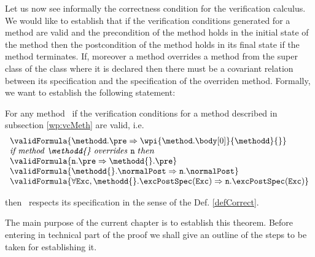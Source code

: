 
Let us now see informally the correctness condition for the verification calculus. 
We would like to establish that if the verification conditions
generated for a method 
are valid 
and the precondition of the method holds in the initial state of the method 
then the postcondition of  the method holds in its final state if the method terminates. 
If, moreover a method overrides a method from the super class of the class where it is declared then there must be a covariant 
relation between its specification and the specification of the overriden method.
Formally, we want to establish the following statement:

\begin{vcGenCorrect}\label{vcGenCorrect}
For any  method \methodd \  if the verification conditions for a method described in subsection \ref{wp:vcMeth}
are valid, i.e. 
$$  \begin{array}{l}  \validFormula{\methodd.\pre \Rightarrow \wpi{\method.\body[0]}{\methodd}{}} \\

       \mbox{\rm\textit{if method \methodd{} overrides }} \mbox{\rm\texttt{n}} \ then \\
        
        \validFormula{\mbox{\rm\texttt{n}} . \pre \Rightarrow \methodd{}.\pre}\\
	\validFormula{ \methodd{}.\normalPost \Rightarrow \mbox{\rm\texttt{n}} .\normalPost}\\
	\validFormula{   \forall \mbox{\rm\texttt{Exc}} , \methodd{}.\excPostSpec(\mbox{\rm\texttt{Exc}}  )    \Rightarrow \mbox{\rm\texttt{n}}.\excPostSpec(\mbox{\rm\texttt{Exc}}  ) }
\end{array}
 $$


 then \methodd \ respects its specification in the sense of the Def. \ref{defCorrect}. 
\end{vcGenCorrect}

The main purpose of the current chapter is to establish this theorem. Before entering in technical part of the proof
we shall give an outline of the steps to be taken for establishing it.
